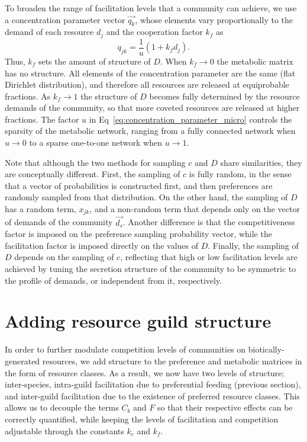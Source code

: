 \documentclass[12pt]{article}
\begin{document}
To broaden the range of facilitation levels that a community can achieve, we use a concentration parameter vector $\vec{q_k}$, whose elements vary proportionally to the demand of each resource $d_j$ and the cooperation factor $k_f$ as
\begin{equation}\label{eq:concentration_parameter_micro}
    q_{jk} = \frac{1}{u}(1 + k_f d_j).
\end{equation}
Thus, $k_f$ sets the amount of structure of $D$. When $k_f \rightarrow 0$ the metabolic matrix has no structure. All elements of the concentration parameter are the same (flat Dirichlet distribution), and therefore all resources are released at equiprobable fractions. As $k_f \rightarrow 1$ the structure of $D$ becomes fully determined by the resource demands of the community, so that more coveted resources are released at higher fractions. The factor $u$ in Eq~\ref{eq:concentration_parameter_micro} controls the sparsity  of  the  metabolic  network, ranging  from  a  fully  connected  network when $u\rightarrow0$ to a sparse one-to-one network when $u\rightarrow1$.

Note that although the two methods for sampling $ c $ and $ D $ share similarities, they are conceptually different. First, the sampling of $ c $ is fully random, in the sense that a vector of probabilities is constructed first, and then preferences are randomly sampled from that distribution. On the other hand, the sampling of $ D $ has a random term, $ x_{jk} $, and a non-random term that depends only on the vector of demands of the community $ \vec{d_s} $. Another difference is that the competitiveness factor is imposed on the preference sampling probability vector, while the facilitation factor is imposed directly on the values of $ D $. Finally, the sampling of $ D $ depends on the sampling of $ c $, reflecting that high or low facilitation levels are achieved by tuning the secretion structure of the community to be symmetric to the profile of demands, or independent from it, respectively.
 
\section{Adding resource guild structure} \label{general_sampling_scenario_supp}

In order to further modulate competition levels of communities on biotically-generated resources, we add structure to the preference and metabolic matrices  in the form of resource classes. As a result, we now have two levels of structure; inter-species, intra-guild facilitation due to preferential feeding (previous section), and inter-guild facilitation due to the existence of preferred resource classes. This allows us to decouple the terms $C_b$ and $F$ so that their respective effects can be correctly quantified, while keeping the levels of facilitation and competition adjustable through the constants $k_c$ and $k_f$.
\end{document}
